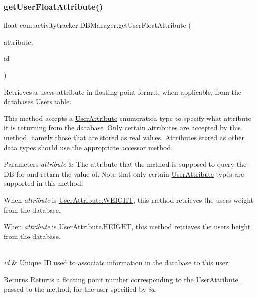 \subsubsection{\texorpdfstring{get\+User\+Float\+Attribute()}{getUserFloatAttribute()}}
{\footnotesize\ttfamily float com.\+activitytracker.\+D\+B\+Manager.\+get\+User\+Float\+Attribute (\begin{DoxyParamCaption}\item[{final \mbox{\hyperlink{enumcom_1_1activitytracker_1_1_user_attribute}{User\+Attribute}}}]{attribute,  }\item[{final int}]{id }\end{DoxyParamCaption})}

Retrieves a user\textquotesingle{}s attribute in floating point format, when applicable, from the database\textquotesingle{}s Users table.

This method accepts a \mbox{\hyperlink{enumcom_1_1activitytracker_1_1_user_attribute}{User\+Attribute}} enumeration type to specify what attribute it is returning from the database. Only certain attributes are accepted by this method, namely those that are stored as real values. Attributes stored as other data types should use the appropriate accessor method.


\begin{DoxyParams}{Parameters}
{\em attribute} & The attribute that the method is supposed to query the DB for and return the value of. Note that only certain \mbox{\hyperlink{enumcom_1_1activitytracker_1_1_user_attribute}{User\+Attribute}} types are supported in this method.
\begin{DoxyItemize}
\item When {\itshape attribute} is \mbox{\hyperlink{enumcom_1_1activitytracker_1_1_user_attribute_a024206b0dc3261031ef586b3f0fd530c}{User\+Attribute.\+W\+E\+I\+G\+HT}}, this method retrieves the user\textquotesingle{}s weight from the database.
\item When {\itshape attribute} is \mbox{\hyperlink{enumcom_1_1activitytracker_1_1_user_attribute_a0a80ca5cce8eb4494c2128bd4291a5b7}{User\+Attribute.\+H\+E\+I\+G\+HT}}, this method retrieves the user\textquotesingle{}s height from the database. 
\end{DoxyItemize}\\
\hline
{\em id} & Unique ID used to associate information in the database to this user.\\
\hline
\end{DoxyParams}
\begin{DoxyReturn}{Returns}
Returns a floating point number corresponding to the \mbox{\hyperlink{enumcom_1_1activitytracker_1_1_user_attribute}{User\+Attribute}} passed to the method, for the user specified by {\itshape id}. 
\end{DoxyReturn}


